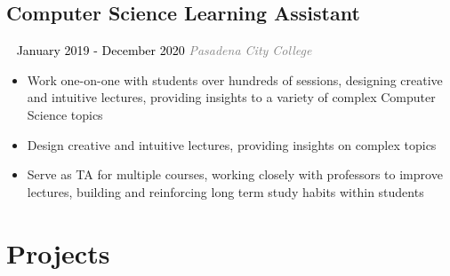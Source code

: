 \documentclass{article}
\newcommand{\resumesection}[3]{
    \subsection*{#1}
    \ 
    \normalsize
    \normalsize
    \hfill
    \textcolor{black}{#3}
    \normalsize
    \newline
    \small
    \textcolor{grey}{\emph{#2}}
}
\begin{document}
\resumesection{Computer Science Learning Assistant}{Pasadena City College}{January 2019 - December 2020}
\begin{itemize}
    \item Work one-on-one with students over hundreds of sessions, designing creative and intuitive lectures, providing insights to a variety of complex Computer Science topics
    \item Design creative and intuitive lectures, providing insights on complex topics
    \item Serve as TA for multiple courses, working closely with professors to improve lectures, building and reinforcing long term study habits within students
\end{itemize}
\section*{Projects}
\end{document}
